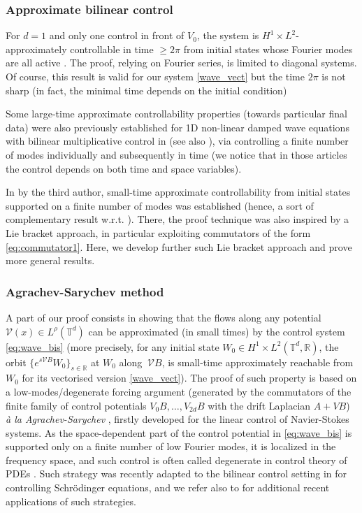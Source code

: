 \documentclass[a4paper]{article}
\theoremstyle{plain}
\newcommand{\T}{\mathbb{T}}
\newcommand{\R}{\mathbb{R}}
\begin{document}
\subsubsection{Approximate bilinear control}

For $d=1$ and only one control in front of $V_0$, the system is $H^1\times L^2$-approximately controllable  in time $\geq 2\pi$ from initial states whose Fourier modes are all active \cite{BMS}.
The proof, relying on Fourier series, is limited to diagonal systems. Of course, this result is valid for our system \eqref{wave_vect} but the time $2\pi$ is not sharp (in fact, the minimal time depends on the initial condition)

Some large-time approximate controllability properties (towards particular final data) were also previously established for 1D non-linear damped wave equations with bilinear multiplicative control in \cite{khapalov-wave1} (see also \cite{khapalov-wave2}), via controlling a finite number of modes individually and subsequently in time (we notice that in those articles the control depends on both time and space variables).

In \cite{pozzoli} by the third author, small-time approximate controllability from initial states supported on a finite number of modes was established (hence, a sort of complementary result w.r.t. \cite{BMS}). There, the proof technique was also inspired by a Lie bracket approach, in particular exploiting commutators of the form \eqref{eq:commutator1}. Here, we develop further such Lie bracket approach and prove more general results.



\subsubsection{Agrachev-Sarychev method}
A part of our proof consists in showing that the flows along any potential $\mathcal{V}(x)\in L^\rho(\T^d)$ can be approximated (in small times) by the control system \eqref{eq:wave_bis} (more precisely, for any initial state $W_0\in H^1\times L^2(\T^d,\R)$, the orbit $\{e^{s\mathcal{V}B}W_0\}_{s\in \R}$ at $W_0$ along $\
\mathcal{V}B$, is small-time approximately reachable from $W_0$ for its vectorised version \eqref{wave_vect}). The proof of such property is based on a low-modes/degenerate forcing argument (generated by the commutators of the finite family of control potentials $V_0B,\dots,V_{2d}B
$ with the drift Laplacian $A+VB$) \emph{à la Agrachev-Sarychev} \cite{agrachev-sarychev,agrachev2}, firstly developed for the linear control of Navier-Stokes systems. As the space-dependent part of the control potential in \eqref{eq:wave_bis} is supported only on a finite number of low Fourier modes, it is localized in the frequency space, and such control is often called degenerate in control theory of PDEs \cite{rissel-nersesyan}. Such strategy was recently adapted to the bilinear control setting in \cite{duca-nersesyan} for controlling Schrödinger equations, and we refer also to \cite{coron-xiang-zhang,beauchard-pozzoli2} for additional recent applications of such strategies.
\end{document}
